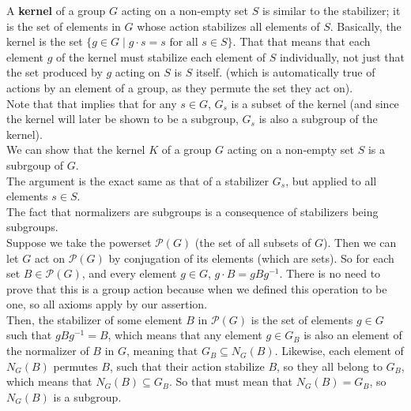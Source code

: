 \documentclass[12pt]{article}
\begin{document}
    A \textbf{kernel} of a group $G$ acting on a non-empty set $S$
    is similar to the stabilizer;
    it is the set of elements in $G$ whose action stabilizes
    all elements of $S$.
    Basically, the kernel is the set
    $\{ g \in G \mid g \cdot s = s \text{ for all } s \in S \}$.
    That that means that each element $g$ of the kernel
    must stabilize each element of $S$ individually,
    not just that the set produced by $g$ acting on $S$ is $S$ itself.
    (which is automatically true of actions by an element of a group,
    as they permute the set they act on). \\
    Note that that implies that for any $s \in G$,
    $G_s$ is a subset of the kernel
    (and since the kernel will later be shown to be a subgroup,
    $G_s$ is also a subgroup of the kernel). \\

    We can show that the kernel $K$ of a group $G$ acting on
    a non-empty set $S$ is a subrgoup of $G$. \\
    The argument is the exact same as that of a stabilizer $G_s$,
    but applied to all elements $s \in S$. \\

    The fact that normalizers are subgroups
    is a consequence of stabilizers being subgroups. \\
    Suppose we take the powerset $\mathcal{P}(G)$
    (the set of all subsets of $G$).
    Then we can let $G$ act on $\mathcal{P}(G)$
    by conjugation of its elements (which are sets).
    So for each set $B \in \mathcal{P}(G)$,
    and every element $g \in G$,
    $g \cdot B = gBg^{-1}$.
    There is no need to prove that this is a group action
    because when we defined this operation to be one,
    so all axioms apply by our assertion. \\
    Then, the stabilizer of some element $B$ in $\mathcal{P}(G)$
    is the set of elements $g \in G$ 
    such that $gBg^{-1} = B$,
    which means that any element $g \in G_B$ 
    is also an element of the normalizer of $B$ in $G$,
    meaning that $G_B \subseteq N_G(B)$.
    Likewise, each element of $N_G(B)$ permutes $B$,
    such that their action stabilize $B$,
    so they all belong to $G_B$,
    which means that $N_G(B) \subseteq G_B$.
    So that must mean that $N_G(B) = G_B$,
    so $N_G(B)$ is a subgroup. \\
\end{document}
